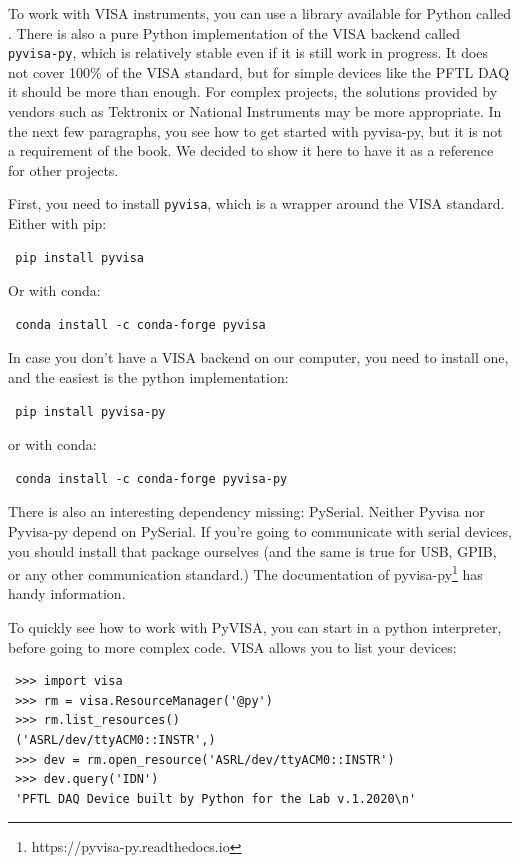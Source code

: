 To work with VISA instruments, you can use a library available for Python called . There is also a pure Python implementation of the VISA backend called \texttt{pyvisa-py}, which is relatively stable even if it is still work in progress. It does not cover 100\% of the VISA standard, but for simple devices like the {PFTL DAQ} it should be more than enough. For complex projects, the solutions provided by vendors such as Tektronix or National Instruments may be more appropriate. In the next few paragraphs, you see how to get started with pyvisa-py, but it is not a requirement of the book. We decided to show it here to have it as a reference for other projects.

First, you need to install \texttt{pyvisa}, which is a wrapper around the VISA standard. Either with pip:

\begin{verbatim}
 pip install pyvisa
\end{verbatim}

Or with conda:

\begin{verbatim}
 conda install -c conda-forge pyvisa
\end{verbatim}

In case you don't have a VISA backend on our computer, you need to install one, and the easiest is the python implementation:

\begin{verbatim}
 pip install pyvisa-py
\end{verbatim}

or with conda:

\begin{verbatim}
 conda install -c conda-forge pyvisa-py
\end{verbatim}

There is also an interesting dependency missing: PySerial. Neither Pyvisa nor Pyvisa-py depend on PySerial. If you're going to communicate with serial devices, you should install that package ourselves (and the same is true for USB, GPIB, or any other communication standard.) The documentation of pyvisa-py\footnote{https://pyvisa-py.readthedocs.io} has handy information.

To quickly see how to work with PyVISA, you can start in a python interpreter, before going to more complex code. VISA allows you to list your devices:

\begin{verbatim}
 >>> import visa
 >>> rm = visa.ResourceManager('@py')
 >>> rm.list_resources()
 ('ASRL/dev/ttyACM0::INSTR',)
 >>> dev = rm.open_resource('ASRL/dev/ttyACM0::INSTR')
 >>> dev.query('IDN')
 'PFTL DAQ Device built by Python for the Lab v.1.2020\n'
\end{verbatim}

